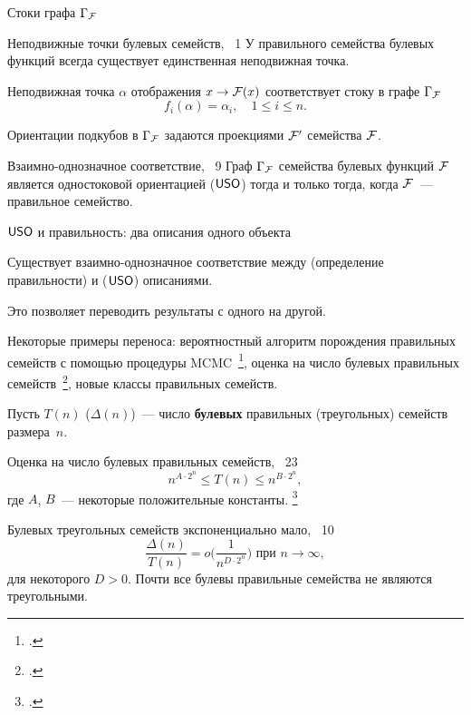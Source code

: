\begin{frame}{Стоки графа $\Gamma_{\mathcal{F}}$}
    \begin{mytheorem}{Неподвижные точки булевых семейств, \lem~1}
        У правильного семейства булевых функций всегда существует единственная неподвижная точка.
    \end{mytheorem}
    \begin{coloritemize}
        \item  Неподвижная точка $\alpha$ отображения $x \to \mathcal{F}(x)$ соответствует стоку в графе $\Gamma_{\mathcal{F}}$ 
        \[
            f_i(\alpha) = \alpha_i, \quad 1 \le i \le n.
        \]
        \pause 
        \item Ориентации подкубов в $\Gamma_{\mathcal{F}}$ задаются проекциями $\mathcal{F}'$ семейства $\mathcal{F}$.
    \end{coloritemize}
    \begin{mytheorem}{Взаимно-однозначное соответствие, \thm~9}
        Граф $\Gamma_{\mathcal{F}}$ семейства булевых функций $\mathcal{F}$ является одностоковой ориентацией ($\mathsf{USO}$) тогда и только тогда, когда $\mathcal{F}$~--- правильное семейство.
    \end{mytheorem}
\end{frame}


\begin{frame}{$\mathsf{USO}$ и правильность: два описания одного объекта}  
    \begin{coloritemize}
        \item Существует взаимно-однозначное соответствие между  (определение правильности) и  ($\mathsf{USO}$) описаниями.
        \item Это позволяет переводить результаты с одного на другой.
        \item Некоторые примеры переноса: вероятностный алгоритм порождения правильных семейств с помощью процедуры MCMC~\footcite{USOphd, galatenko21generation}, оценка на число булевых правильных семейств~\footcite{dm21}, новые классы правильных семейств.
    \end{coloritemize}    
\end{frame}


\begin{frame}
    Пусть $T(n)$ ($\Delta(n)$)~--- число \textbf{булевых} правильных (треугольных) семейств размера~$n$.
    \begin{mypropos}{Оценка на число булевых правильных семейств, \propos~23}
        \[
            n^{A \cdot 2^n} \le T(n) \le n^{B \cdot 2^n},
        \]
        где $A$, $B$~--- некоторые положительные константы.
        \footcitetext{numberUSO}
    \end{mypropos}
    \pause 
    \begin{mytheorem}{Булевых треугольных семейств экспоненциально мало, \thm~10}
        \[
            \frac{\Delta(n)}{T(n)} = o \Big(\frac{1}{n^{D \cdot 2^n}} \Big) \text{ при } n \to \infty,
        \]
        для некоторого $D > 0$.
        Почти все булевы правильные семейства не являются треугольными.
    \end{mytheorem}
\end{frame}


